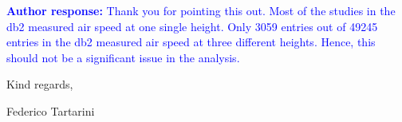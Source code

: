 \documentclass[a4paper, 10pt]{letter}
\newcommand{\response}[1]{\textcolor{blue}{\textbf{Author response:} #1}}
\begin{document}
\begin{letter}
\begin{enumerate}
            \response{
                Thank you for pointing this out.
                Most of the studies in the \ac{db2} measured air speed at one single height.
                Only \num{3059} entries out of \num{49245} entries in the \ac{db2} measured air speed at three different heights.
                Hence, this should not be a significant issue in the analysis.
            }

        \end{enumerate}

        Kind regards,

        \vspace*{5px}

        Federico Tartarini

    \end{letter}
\end{document}
